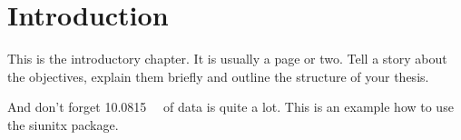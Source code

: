 \chapter{Introduction}
This is the introductory chapter.
It is usually a page or two.
Tell a story about the objectives, explain them briefly and outline the structure of your thesis.

And don't forget \SI{10.0815}{\giga\byte} of data is quite a lot.
This is an example how to use the siunitx package.

